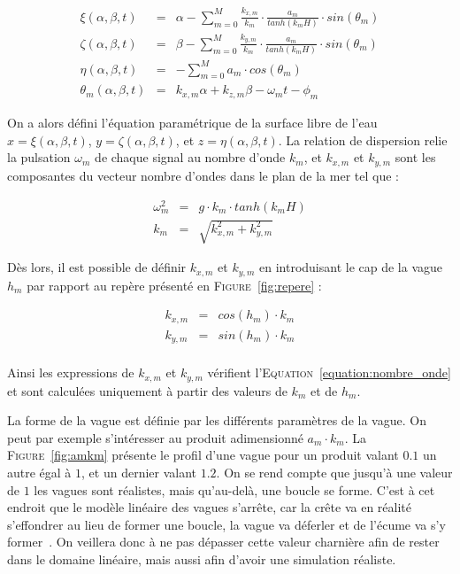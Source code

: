 				\begin{eqnarray}
					\xi(\alpha, \beta, t) & = & \alpha - \sum_{m=0}^{M} \frac{k_{x, m}}{k_m} \cdot \frac{a_m}{tanh(k_m H)} \cdot sin(\theta_m) \label{eqn:xi}\\ 
					\zeta(\alpha, \beta, t) & = & \beta - \sum_{m=0}^{M} \frac{k_{y, m}}{k_m} \cdot \frac{a_m}{tanh(k_m H)} \cdot sin(\theta_m) \label{eqn:zeta}\\ 
					\eta(\alpha, \beta, t) & = & - \sum_{m=0}^{M} a_m \cdot cos(\theta_m) \label{eqn:eta}\\ 
					\theta_m(\alpha, \beta, t) & = & k_{x, m} \alpha + k_{z, m} \beta - \omega_m t - \phi_m \label{eqn:theta}
				\end{eqnarray}

				On a alors défini l'équation paramétrique de la surface libre de l'eau $x = \xi(\alpha, \beta, t)$, $y = \zeta(\alpha, \beta, t)$, et $z = \eta(\alpha, \beta, t)$. La relation de dispersion relie la pulsation $\omega_m$ de chaque signal au nombre d'onde $k_m$, et $k_{x, m}$ et $k_{y, m}$ sont les composantes du vecteur nombre d'ondes dans le plan de la mer tel que  :
				
				\begin{eqnarray}
					\omega_m^2 & = & g \cdot k_m \cdot tanh(k_m H) \label{equation:dispersion} \\
					k_m & = & \sqrt{k_{x, m}^2 + k_{y, m}^2} \label{equation:nombre_onde}
				\end{eqnarray}

				Dès lors, il est possible de définir $k_{x, m}$ et $k_{y, m}$ en introduisant le cap de la vague $h_m$ par rapport au repère présenté en \textsc{Figure}~\ref{fig:repere} :

				\begin{eqnarray}
					k_{x, m} & = & cos(h_m) \cdot k_m \\
					k_{y, m} & = & sin(h_m) \cdot k_m \\
				\end{eqnarray}

				Ainsi les expressions de $k_{x, m}$ et $k_{y, m}$ vérifient l'\textsc{Equation}~\ref{equation:nombre_onde} et sont calculées uniquement à partir des valeurs de $k_m$ et de $h_m$.
				
				La forme de la vague est définie par les différents paramètres de la vague. On peut par exemple s'intéresser au produit adimensionné $a_m\cdot k_m$. La \textsc{Figure}~\ref{fig:amkm} présente le profil d'une vague pour un produit valant $0.1$ un autre égal à $1$, et un dernier valant $1.2$. On se rend compte que jusqu'à une valeur de $1$ les vagues sont réalistes, mais qu'au-delà, une boucle se forme. C'est à cet endroit que le modèle linéaire des vagues s'arrête, car la crête va en réalité s'effondrer au lieu de former une boucle, la vague va déferler et de l'écume va s'y former~\cite{Gerstner-Like_Henry, Gerstner_Pixar}. On veillera donc à ne pas dépasser cette valeur charnière afin de rester dans le domaine linéaire, mais aussi afin d'avoir une simulation réaliste.

